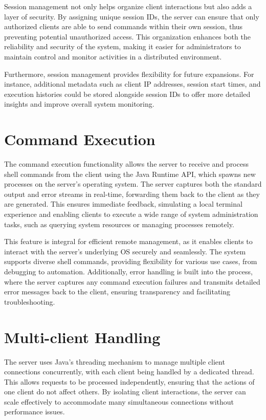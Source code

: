 \documentclass[12pt,a4paper]{report}
\begin{document}
Session management not only helps organize client interactions but also adds a layer of security. By assigning unique session IDs, the server can ensure that only authorized clients are able to send commands within their own session, thus preventing potential unauthorized access. This organization enhances both the reliability and security of the system, making it easier for administrators to maintain control and monitor activities in a distributed environment.

Furthermore, session management provides flexibility for future expansions. For instance, additional metadata such as client IP addresses, session start times, and execution histories could be stored alongside session IDs to offer more detailed insights and improve overall system monitoring.

\section{Command Execution}
The command execution functionality allows the server to receive and process shell commands from the client using the Java Runtime API, which spawns new processes on the server's operating system. The server captures both the standard output and error streams in real-time, forwarding them back to the client as they are generated. This ensures immediate feedback, simulating a local terminal experience and enabling clients to execute a wide range of system administration tasks, such as querying system resources or managing processes remotely.

This feature is integral for efficient remote management, as it enables clients to interact with the server’s underlying OS securely and seamlessly. The system supports diverse shell commands, providing flexibility for various use cases, from debugging to automation. Additionally, error handling is built into the process, where the server captures any command execution failures and transmits detailed error messages back to the client, ensuring transparency and facilitating troubleshooting.

\section{Multi-client Handling}
The server uses Java's threading mechanism to manage multiple client connections concurrently, with each client being handled by a dedicated thread. This allows requests to be processed independently, ensuring that the actions of one client do not affect others. By isolating client interactions, the server can scale effectively to accommodate many simultaneous connections without performance issues.
\end{document}
